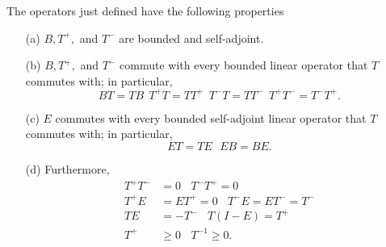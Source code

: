 \begin{lemma}\label{9.8-1} 
    The operators just defined have the following properties 
    \begin{enumerate}
        \item[(a)] \( B , T^{+},  \) and \( T^{-} \) are bounded and self-adjoint.
        \item[(b)] \( B, T^{+},  \) and \( T^{-} \) commute with every bounded linear operator that \( T  \) commutes with; in particular,
            \[  BT = TB  \ \ T^{+}T = T T^{+} \ \ T^{-} T = T T^{-} \ \ T^{+} T^{-} = T^{-} T^{+}.  \]
        \item[(c)] \( E  \) commutes with every bounded self-adjoint linear operator that \( T  \) commutes with; in particular, 
            \[  E T = TE  \ \ \ EB = BE.  \]
        \item[(d)] Furthermore,
            \begin{align*}
                T^{+} T^{-} &= 0  \ \ \ \ T^{-} T^{+} = 0   \\
                T^{+} E &= E T^{+ } = 0 \ \ \ \  T^{-}E = E T^{-} = T^{-} \\
                TE  &= - T^{-}  \ \ \  \  T(I  - E ) = T^{+} \\
                T^{+} &\geq 0  \ \ \ \ T^{-1} \geq 0. 
            \end{align*}
    \end{enumerate}
\end{lemma}

